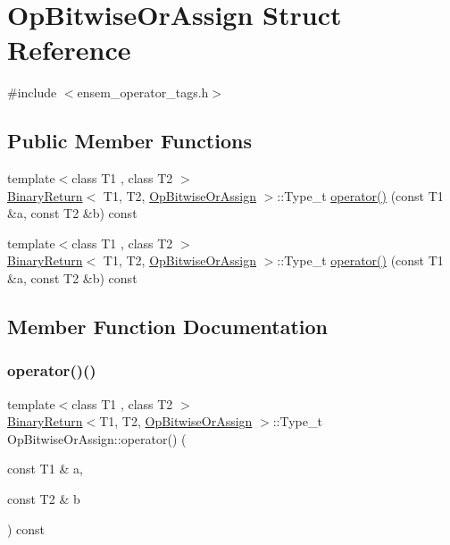 \hypertarget{structOpBitwiseOrAssign}{}\section{Op\+Bitwise\+Or\+Assign Struct Reference}
\label{structOpBitwiseOrAssign}


{\ttfamily \#include $<$ensem\+\_\+operator\+\_\+tags.\+h$>$}

\subsection*{Public Member Functions}
\begin{DoxyCompactItemize}
\item 
{\footnotesize template$<$class T1 , class T2 $>$ }\\\mbox{\hyperlink{structBinaryReturn}{Binary\+Return}}$<$ T1, T2, \mbox{\hyperlink{structOpBitwiseOrAssign}{Op\+Bitwise\+Or\+Assign}} $>$\+::Type\+\_\+t \mbox{\hyperlink{structOpBitwiseOrAssign_abdf5c9f46dce33611878cf271e3b7a09}{operator()}} (const T1 \&a, const T2 \&b) const
\item 
{\footnotesize template$<$class T1 , class T2 $>$ }\\\mbox{\hyperlink{structBinaryReturn}{Binary\+Return}}$<$ T1, T2, \mbox{\hyperlink{structOpBitwiseOrAssign}{Op\+Bitwise\+Or\+Assign}} $>$\+::Type\+\_\+t \mbox{\hyperlink{structOpBitwiseOrAssign_abdf5c9f46dce33611878cf271e3b7a09}{operator()}} (const T1 \&a, const T2 \&b) const
\end{DoxyCompactItemize}


\subsection{Member Function Documentation}
\mbox{\label{structOpBitwiseOrAssign_abdf5c9f46dce33611878cf271e3b7a09}} 
\subsubsection{\texorpdfstring{operator()()}{operator()()}\hspace{0.1cm}{\footnotesize\ttfamily [1/2]}}
{\footnotesize\ttfamily template$<$class T1 , class T2 $>$ \\
\mbox{\hyperlink{structBinaryReturn}{Binary\+Return}}$<$T1, T2, \mbox{\hyperlink{structOpBitwiseOrAssign}{Op\+Bitwise\+Or\+Assign}} $>$\+::Type\+\_\+t Op\+Bitwise\+Or\+Assign\+::operator() (\begin{DoxyParamCaption}\item[{const T1 \&}]{a,  }\item[{const T2 \&}]{b }\end{DoxyParamCaption}) const\hspace{0.3cm}{\ttfamily [inline]}}

